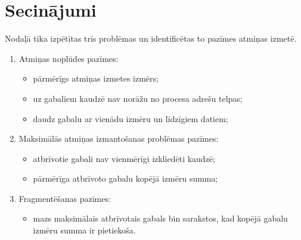 \section{Secinājumi}
Nodaļā tika izpētītas trīs problēmas un identificētas to pazīmes atmiņas izmetē.
\begin{enumerate}
\item Atmiņas noplūdes pazīmes:
    \begin{itemize} \itemsep5pt \parskip5pt 
        \item pārmērīgs atmiņas izmetes izmērs;
        \item uz gabaliem kaudzē nav norāžu no procesa adrešu telpas;
        \item daudz gabalu ar vienādu izmēru un līdzīgiem datiem;
    \end{itemize}
\item Maksimālās atmiņas izmantošanas problēmas pazīmes:
    \begin{itemize} \itemsep5pt \parskip5pt 
        \item atbrīvotie gabali nav vienmērīgi izkliedēti kaudzē;
        \item pārmērīga atbrīvoto gabalu kopējā izmēru summa;
    \end{itemize}
 \item Fragmentēšanas pazīmes:
    \begin{itemize} \itemsep5pt \parskip5pt 
        \item mazs maksimālais atbrīvotais gabals bin sarakstos, kad kopējā gabalu izmēru summa ir pietiekoša.
    \end{itemize}
\end{enumerate}



